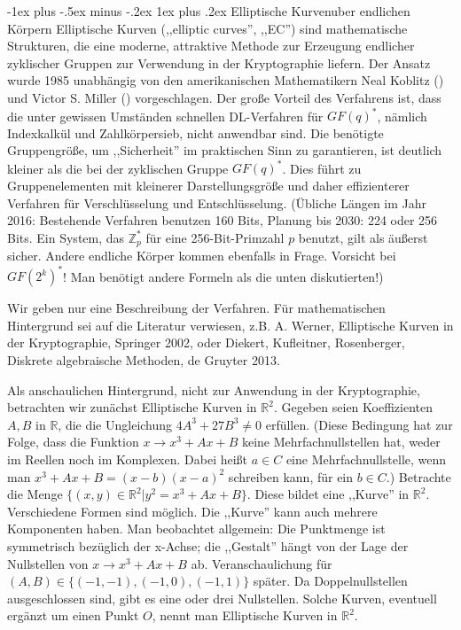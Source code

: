 \documentclass[a4paper]{article}
\makeatletter
\renewcommand{\subsubsection}{\@startsection{subsubsection}{3}{0mm}%
 {-1ex plus -.5ex minus -.2ex}%
 {1ex plus .2ex}%
 {\normalfont\small\bfseries}}
\makeatother
\begin{document}
\begin{multicols}{3}
    \subsubsection{Elliptische Kurvenuber endlichen Körpern}
    Elliptische Kurven (,,elliptic curves'', ,,EC'') sind mathematische Strukturen, die eine moderne, attraktive Methode zur Erzeugung endlicher zyklischer Gruppen zur Verwendung in der Kryptographie liefern. Der Ansatz wurde 1985 unabhängig von den amerikanischen Mathematikern Neal Koblitz () und Victor S. Miller () vorgeschlagen. Der große Vorteil des Verfahrens ist, dass die unter gewissen Umständen schnellen DL-Verfahren für $GF(q)^*$, nämlich Indexkalkül und Zahlkörpersieb, nicht anwendbar sind. Die benötigte Gruppengröße, um ,,Sicherheit'' im praktischen Sinn zu garantieren, ist deutlich kleiner als die bei der zyklischen Gruppe $GF(q)^*$. Dies führt zu Gruppenelementen mit kleinerer Darstellungsgröße und daher effizienterer Verfahren für Verschlüsselung und Entschlüsselung.
    (Übliche Längen im Jahr 2016: Bestehende Verfahren benutzen 160 Bits, Planung bis 2030: 224 oder 256 Bits. Ein System, das $\mathbb{Z}^*_p$ für eine 256-Bit-Primzahl $p$ benutzt, gilt als äußerst sicher. Andere endliche Körper kommen ebenfalls in Frage. Vorsicht bei $GF(2^k)^*$! Man benötigt andere Formeln als die unten diskutierten!)

    Wir geben nur eine Beschreibung der Verfahren. Für mathematischen Hintergrund sei auf die Literatur verwiesen, z.B. A. Werner, Elliptische Kurven in der Kryptographie, Springer 2002, oder Diekert, Kufleitner, Rosenberger, Diskrete algebraische Methoden, de Gruyter 2013.

    Als anschaulichen Hintergrund, nicht zur Anwendung in der Kryptographie, betrachten wir zunächst Elliptische Kurven in $\mathbb{R}^2$. Gegeben seien Koeffizienten $A, B$ in $\mathbb{R}$, die die Ungleichung $4A^3+ 27B^3 \not= 0$ erfüllen. (Diese Bedingung hat zur Folge, dass die Funktion $x\rightarrow x^3+Ax+B$ keine Mehrfachnullstellen hat, weder im Reellen noch im Komplexen. Dabei heißt $a\in C$ eine Mehrfachnullstelle, wenn man $x^3+Ax+B= (x-b)(x-a)^2$ schreiben kann, für ein $b\in C$.) Betrachte die Menge $\{(x,y)\in\mathbb{R}^2| y^2=x^3+Ax+B\}$.
    Diese bildet eine ,,Kurve'' in $\mathbb{R}^2$. Verschiedene Formen sind möglich. Die ,,Kurve'' kann auch mehrere Komponenten haben. Man beobachtet allgemein: Die Punktmenge ist symmetrisch bezüglich der x-Achse; die ,,Gestalt'' hängt von der Lage der Nullstellen von $x\rightarrow x^3+Ax+B$ ab. Veranschaulichung für $(A,B)\in\{(- 1 ,-1),(- 1 ,0),(- 1 ,1)\}$ später. Da Doppelnullstellen ausgeschlossen sind, gibt es eine oder drei Nullstellen.
    Solche Kurven, eventuell ergänzt um einen Punkt $O$, nennt man Elliptische Kurven in $\mathbb{R}^2$.


\end{multicols}
\end{document}
